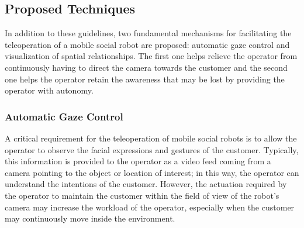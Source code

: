 \documentclass[journal]{IEEEtran}
\begin{document}
\subsection{Proposed Techniques}
\label{subsec:proposed}
In addition to these guidelines, two fundamental mechanisms for facilitating the teleoperation of a mobile social robot are proposed: automatic gaze control and visualization of spatial relationships.
The first one helps relieve the operator from continuously having to direct the camera towards the customer and the second one helps the operator retain the awareness that may be lost by providing the operator with autonomy.

\subsubsection{Automatic Gaze Control}
A critical requirement for the teleoperation of mobile social robots is to allow the operator to observe the facial expressions and gestures of the customer.
Typically, this information is provided to the operator as a video feed coming from a camera pointing to the object or location of interest; in this way, the operator can understand the intentions of the customer.
However, the actuation required by the operator to maintain the customer within the field of view of the robot's camera may increase the workload of the operator, especially when the customer may continuously move inside the environment.

\end{document}
